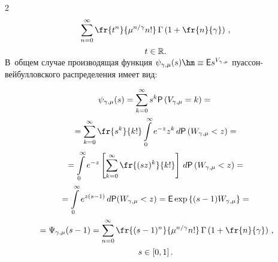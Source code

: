 \begin{multicols}{2}
\begin{multline*}
\sum\limits_{n=0}^{\infty}\fr{t^n}{\mu^{n/\gamma}n!}\,\Gamma


\left(1+\fr{n}{\gamma}\right)\,,\\[1pt]


t\in\mathbb{R}.


\vspace*{-12pt}


\end{multline*}








\noindent


В~общем случае производящая функция $\psi_{\gamma,\mu}(s)\hm \equiv 


{\sf E}s^{V_{\gamma,\mu}}$ пуас\-сон-вей\-бул\-лов\-ско\-го распределения имеет вид:





\noindent


\begin{multline*}


\psi_{\gamma,\mu}(s)=\sum\limits_{k=0}^{\infty}s^k{\sf P}


\left(V_{\gamma,\mu}=k\right)={}\\[1pt]


{}=\sum\limits_{k=0}^{\infty}


\fr{s^k}{k!}\int\limits_{0}^{\infty}e^{-z}z^k\,d{\sf P}


\left(W_{\gamma,\mu}<z\right)={}\\[1pt]


{}=\int\limits_{0}^{\infty}


e^{-z}\left[\sum\limits_{k=0}^{\infty}\fr{(sz)^k}{k!}\right]\,d{\sf P}


\left(W_{\gamma,\mu}<z\right)= {}\\[1pt]


{}=\int\limits_{0}^{\infty}e^{z(s-1)}\,d{\sf P}(W_{\gamma,\mu}<z)={\sf E}


\exp\left\{(s-1)W_{\gamma,\mu}\right\}={}\\[1pt]


{}=


\Psi_{\gamma,\mu}(s-1)=\sum\limits_{n=0}^{\infty}\fr{(s-1)^n}{\mu^{n/\gamma}n!}\,


\Gamma\left(1+\fr{n}{\gamma}\right)\,,\\[1pt]


 s\in[0,1]\,.


\end{multline*}



\end{multicols}
